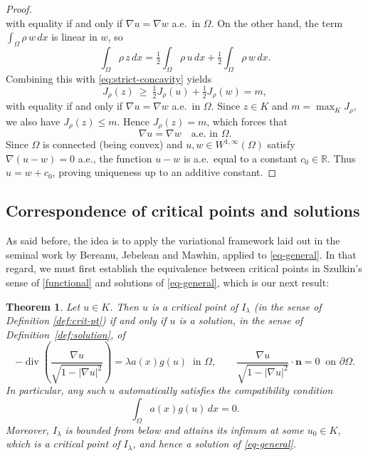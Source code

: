 \documentclass[11pt,reqno]{amsart}
\theoremstyle{plain}
\newtheorem{theorem}{Theorem}[section]
\theoremstyle{definition}
\numberwithin{equation}{section}
\begin{document}
\begin{proof}
\begin{equation}
\end{equation}
with equality if and only if $\nabla u=\nabla w$ a.e.\ in $\Omega$. On the other hand, the term $\int_\Omega\rho\,w\,dx$ is linear in $w$, so
$$
\int_\Omega \rho\,z\,dx=\tfrac12\int_\Omega\rho\,u\,dx+\tfrac12\int_\Omega\rho\,w\,dx.
$$
Combining this with \eqref{eq:strict-concavity} yields
$$
J_\rho(z)\ \ge\ \tfrac12 J_\rho(u)+\tfrac12 J_\rho(w)=m,
$$
with equality if and only if $\nabla u=\nabla w$ a.e.\ in $\Omega$. Since $z\in K$ and $m=\max_K J_\rho$, we also have $J_\rho(z)\le m$. Hence $J_\rho(z)=m$, which forces that
$$
\nabla u=\nabla w\quad\text{a.e.\ in }\Omega.
$$
Since $\Omega$ is connected (being convex) and $u,w\in W^{1,\infty}(\Omega)$ satisfy $\nabla(u-w)=0$ a.e., the function $u-w$ is a.e.\ equal to a constant $c_0\in\mathbb{R}$. Thus $u=w+c_0$, proving uniqueness up to an additive constant.
\end{proof}

\subsection{Correspondence of critical points and solutions}
As said before, the idea is to apply the variational framework laid out in the seminal work \cite{BeJeMa14} by Bereanu, Jebelean and Mawhin, applied to \eqref{eq-general}. In that regard, we must first establish the equivalence between critical points in Szulkin's sense of \eqref{functional} and solutions of \eqref{eq-general}, which is our next result:

\begin{theorem}\label{thm:critical-point-equivalence}
Let $u\in K$. Then $u$ is a critical point of $I_\lambda$ (in the sense of Definition \ref{def:crit-pt}) if and only if $u$ is a solution, in the sense of Definition~\ref{def:solution}, of
\begin{equation}\label{eq:PDE-neumann}
-\operatorname{div}\left(\frac{\nabla u}{\sqrt{1-|\nabla u|^2}}\right)=\lambda a(x)g(u)\ \text{ in }\Omega,
\qquad
\frac{\nabla u}{\sqrt{1-|\nabla u|^2}}\cdot \mathbf n=0\ \text{ on }\partial\Omega.
\end{equation}
In particular, any such $u$ automatically satisfies the compatibility condition
\begin{equation}\label{eq:compatibility}
\int_\Omega a(x)g(u)\,dx=0.
\end{equation}
Moreover, $I_\lambda$ is bounded from below and attains its infimum at some $u_0 \in K$, which is a critical point of $I_\lambda$, and hence a solution of \eqref{eq-general}.
\end{theorem}
\end{document}
